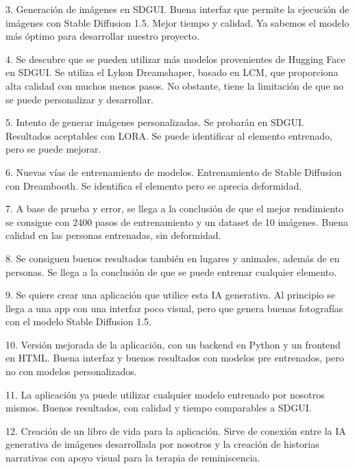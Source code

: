 3. Generación de imágenes en SDGUI. Buena interfaz que permite la ejecución de imágenes con Stable Diffusion 1.5. Mejor tiempo y calidad. Ya sabemos el modelo más óptimo para desarrollar nuestro proyecto.

4. Se descubre que se pueden utilizar más modelos provenientes de Hugging Face en SDGUI. Se utiliza el Lykon Dreamshaper, basado en LCM, que proporciona alta calidad con muchos menos pasos. No obstante, tiene la limitación de que no se puede personalizar y desarrollar.

5. Intento de generar imágenes personalizadas. Se probarán en SDGUI. Resultados aceptables con LORA. Se puede identificar al elemento entrenado, pero se puede mejorar.

6. Nuevas vías de entrenamiento de modelos. Entrenamiento de Stable Diffusion con Dreambooth. Se identifica el elemento pero se aprecia deformidad.

7. A base de prueba y error, se llega a la conclusión de que el mejor rendimiento se consigue con 2400 pasos de entrenamiento y un dataset de 10 imágenes. Buena calidad en las personas entrenadas, sin deformidad.

8. Se consiguen buenos resultados también en lugares y animales, además de en personas. Se llega a la conclusión de que se puede entrenar cualquier elemento.

9. Se quiere crear una aplicación que utilice esta IA generativa. Al principio se llega a una app con una interfaz poco visual, pero que genera buenas fotografías con el modelo Stable Diffusion 1.5.

10. Versión mejorada de la aplicación, con un backend en Python y un frontend en HTML. Buena interfaz y buenos resultados con modelos pre entrenados, pero no con modelos personalizados.

11. La aplicación ya puede utilizar cualquier modelo entrenado por nosotros mismos. Buenos resultados, con calidad y tiempo comparables a SDGUI.

12. Creación de un libro de vida para la aplicación. Sirve de conexión entre la IA generativa de imágenes desarrollada por nosotros y la creación de historias narrativas con apoyo visual para la terapia de reminiscencia.


